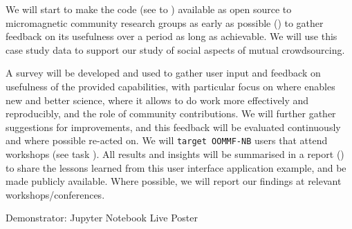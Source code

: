 \begin{workpackage}[id=social-aspects,wphases=0-48,
  title=Social Aspects,
  lead=UO,
  UORM=53,USHRM=8, USORM=5]
\begin{tasklist}
\begin{task}[title=OOMMF case study: Evaluation,lead=USO,PM=5]
  We will start to make the \OOMMFNB{} code (see
   to
  ) available as open
  source to micromagnetic community research groups as early as
  possible
  () to
  gather feedback on its usefulness over a period as long as
  achievable. We will use this case study data to support our study of
  social aspects of mutual crowdsourcing.

  A survey will be developed and used to gather user input and feedback on usefulness of
  the provided capabilities, with particular focus on where \OOMMFNB{} enables new and
  better science, where it allows to do work more effectively and reproducibly, and the
  role of community contributions. We will further gather suggestions for improvements,
  and this feedback will be evaluated continuously and where possible re-acted on. We will
  \texttt{target OOMMF-NB} users that attend workshops (see task
  ). All results and insights will be
  summarised in a report () to share the lessons
  learned from this user interface application example, and be made publicly
  available. Where possible, we will report our findings at relevant
  workshops/conferences.
\end{task}



\end{tasklist}


\begin{wpdelivs}
 \begin{wpdeliv}[due=36,id=social-poster,dissem=PU,nature=DEM]
   {Demonstrator: Jupyter Notebook Live Poster} 
\end{wpdeliv}

\end{wpdelivs}
\end{workpackage}

